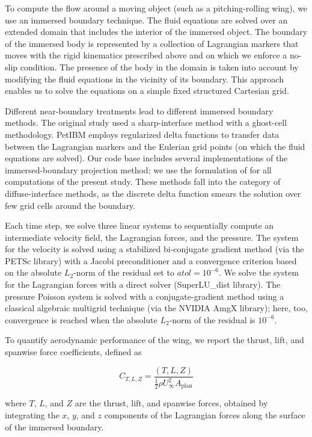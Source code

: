 To compute the flow around a moving object (such as a pitching-rolling wing), we use an immersed boundary technique.
The fluid equations are solved over an extended domain that includes the interior of the immersed object.
The boundary of the immersed body is represented by a collection of Lagrangian markers that moves with the rigid kinematics prescribed above and on which we enforce a no-slip condition.
The presence of the body in the domain is taken into account by modifying the fluid equations in the vicinity of its boundary.
This approach enables us to solve the equations on a simple fixed structured Cartesian grid.

Different near-boundary treatments lead to different immersed boundary methods.
The original study used a sharp-interface method with a ghost-cell methodology.\supercite{mittal_et_al_2008}
PetIBM employs regularized delta functions to transfer data between the Lagrangian markers and the Eulerian grid points (on which the fluid equations are solved).
Our code base includes several implementations of the immersed-boundary projection method\supercite{taira_colonius_2007}; we use the formulation of \citet{li_et_al_2016} for all computations of the present study.
These methods fall into the category of diffuse-interface methods, as the discrete delta function smears the solution over few grid cells around the boundary.

Each time step, we solve three linear systems to sequentially compute an intermediate velocity field, the Lagrangian forces, and the pressure.
The system for the velocity is solved using a stabilized bi-conjugate gradient method (via the PETSc library) with a Jacobi preconditioner and a convergence criterion based on the absolute $L_2$-norm of the residual set to $atol = 10^{-6}$.
We solve the system for the Lagrangian forces with a direct solver (SuperLU\_dist library).
The pressure Poisson system is solved with a conjugate-gradient method using a classical algebraic multigrid technique (via the NVIDIA AmgX library); here, too, convergence is reached when the absolute $L_2$-norm of the residual is $10^{-6}$.

To quantify aerodynamic performance of the wing, we report the thrust, lift, and spanwise force coefficients, defined as

\begin{equation}
  C_{T, L, Z} = \frac{\left( T, L, Z \right)}{\frac{1}{2} \rho U_\infty^2 A_\text{plan}}
\end{equation}

where $T$, $L$, and $Z$ are the thrust, lift, and spanwise forces, obtained by integrating the $x$, $y$, and $z$ components of the Lagrangian forces along the surface of the immersed boundary.

